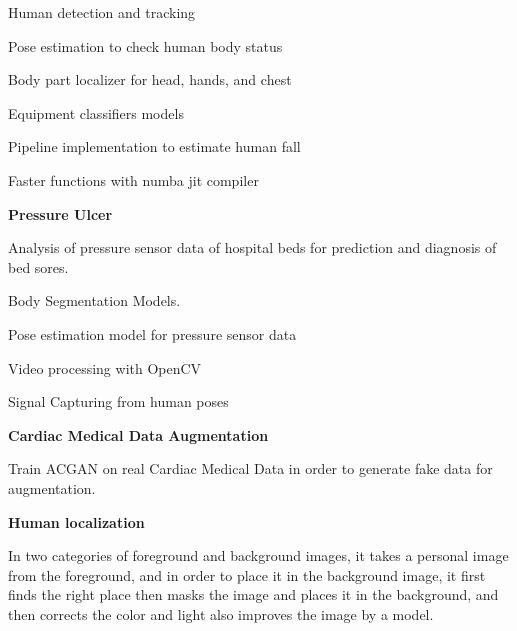 \begin{rubric}{}
            \par \textbullet \hspace{1em}  Human detection and tracking
            \par \textbullet \hspace{1em}  Pose estimation to check human body status 
            \par \textbullet \hspace{1em}  Body part localizer for head, hands, and chest
            \par \textbullet \hspace{1em}  Equipment classifiers models
            \par \textbullet \hspace{1em}  Pipeline implementation to estimate human fall
            \par \textbullet \hspace{1em}  Faster functions with numba jit compiler


\entry*[2021] \textbf{\Large Pressure Ulcer} 
        \par Analysis of pressure sensor data of hospital beds for prediction and diagnosis of bed sores.
        

            \par \textbullet \hspace{1em}  Body Segmentation Models.
            \par \textbullet \hspace{1em}  Pose estimation model for pressure sensor data
            \par \textbullet \hspace{1em}  Video processing with OpenCV
            \par \textbullet \hspace{1em}  Signal Capturing from human poses
        

\entry*[2021] \textbf{\Large Cardiac Medical Data Augmentation}
        \par Train ACGAN on real Cardiac Medical Data in order to generate fake data for augmentation.



\entry*[2021] \textbf{\Large Human localization}
        \par In two categories of foreground and background images, it takes a personal image from the foreground, and in order to place it in the background image, it first finds the right place then masks the image and places it in the background, and then corrects the color and light also improves the image by a model.


\end{rubric}
